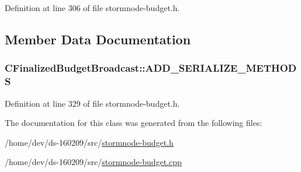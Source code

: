 Definition at line 306 of file stormnode-\/budget.\+h.



\subsection{Member Data Documentation}
\hypertarget{class_c_finalized_budget_broadcast_a543ef11ceec3a6488050d62a7e27a465}{}
\subsubsection[{A\+D\+D\+\_\+\+S\+E\+R\+I\+A\+L\+I\+Z\+E\+\_\+\+M\+E\+T\+H\+O\+D\+S}]{\setlength{\rightskip}{0pt plus 5cm}C\+Finalized\+Budget\+Broadcast\+::\+A\+D\+D\+\_\+\+S\+E\+R\+I\+A\+L\+I\+Z\+E\+\_\+\+M\+E\+T\+H\+O\+D\+S}\label{class_c_finalized_budget_broadcast_a543ef11ceec3a6488050d62a7e27a465}


Definition at line 329 of file stormnode-\/budget.\+h.



The documentation for this class was generated from the following files\+:\begin{DoxyCompactItemize}
\item 
/home/dev/ds-\/160209/src/\hyperlink{stormnode-budget_8h}{stormnode-\/budget.\+h}\item 
/home/dev/ds-\/160209/src/\hyperlink{stormnode-budget_8cpp}{stormnode-\/budget.\+cpp}\end{DoxyCompactItemize}
